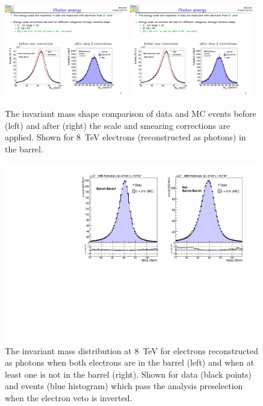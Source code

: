 \begin{figure}
  \includegraphics[width=0.48\textwidth]{analysis_comps/plots/zee_beforecorr.pdf}
  \includegraphics[width=0.48\textwidth]{analysis_comps/plots/zee_aftercorr.pdf}
  \caption[The \Zee invariant mass shape before and after scale and smearing corrections are applied]{The \Zee invariant mass shape comparison of data and MC events before (left) and after (right) the scale and smearing corrections are applied. Shown for 8~TeV electrons (reconstructed as photons) in the barrel.}
  \label{fig:scale_smearing_Zee}
\end{figure}

\begin{figure}
  \includegraphics[width=0.99\textwidth]{analysis_comps/plots/massEBEE.pdf}
  \caption[The \Zee invariant mass distribution at 8~TeV when the electrons are reconstructed as photons]{The \Zee invariant mass distribution at 8~TeV for electrons reconstructed as photons when both electrons are in the barrel (left) and when at least one is not in the barrel (right). Shown for data (black points) and \MC events (blue histogram) which pass the analysis preselection when the electron veto is inverted.}
  \label{fig:scale_smearing_analysis}
\end{figure}

